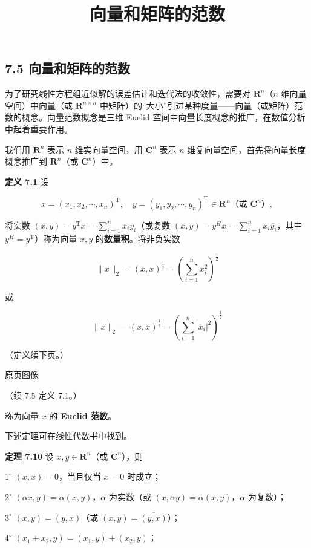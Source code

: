 \documentclass[
  10pt,
  fontset=fandol]{ctexart}
\title{向量和矩阵的范数}
\author{}
\date{}
\begin{document}
\maketitle

\subsection{7.5 向量和矩阵的范数}\label{ux5411ux91cfux548cux77e9ux9635ux7684ux8303ux6570}

为了研究线性方程组近似解的误差估计和迭代法的收敛性，需要对 \(\mathbf R^n\)（\(n\) 维向量空间）中向量（或 \(\mathbf R^{n\times n}\) 中矩阵）的``大小''引进某种度量------向量（或矩阵）范数的概念。向量范数概念是三维 Euclid 空间中向量长度概念的推广，在数值分析中起着重要作用。

我们用 \(\mathbf R^n\) 表示 \(n\) 维实向量空间，用 \(\mathbf C^n\) 表示 \(n\) 维复向量空间，首先将向量长度概念推广到 \(\mathbf R^n\)（或 \(\mathbf C^n\)）中。

\textbf{定义 7.1} 设

\[
x=(x_1,x_2,\cdots,x_n)^{\mathrm T},\quad y=(y_1,y_2,\cdots,y_n)^{\mathrm T}\in\mathbf R^n\text{（或 }\mathbf C^n\text{）},
\]

将实数 \((x,y)=y^{\mathrm T}x=\sum_{i=1}^{n}x_iy_i\)（或复数 \((x,y)=y^Hx=\sum_{i=1}^{n}x_i\overline{y_i}\)，其中 \(y^H=\overline{y^{\mathrm T}}\)）称为向量 \(x,y\) 的\textbf{数量积}。将非负实数

\[
\|x\|_2=(x,x)^{\frac12}=\left(\sum_{i=1}^{n}x_i^2\right)^{\frac12}
\]

或

\[
\|x\|_2=(x,x)^{\frac12}=\left(\sum_{i=1}^{n}|x_i|^2\right)^{\frac12}
\]

（定义续下页。）

\href{../../source-images/pdf-200.jpeg}{原页图像}

（续 7.5 定义 7.1。）

称为向量 \(x\) 的 \textbf{Euclid 范数}。

下述定理可在线性代数书中找到。

\textbf{定理 7.10} 设 \(x,y\in\mathbf R^n\)（或 \(\mathbf C^n\)），则

\(1^\circ\) \((x,x)=0\)，当且仅当 \(x=0\) 时成立；

\(2^\circ\) \((\alpha x,y)=\alpha(x,y)\)，\(\alpha\) 为实数（或 \((x,\alpha y)=\overline\alpha(x,y)\)，\(\alpha\) 为复数）；

\(3^\circ\) \((x,y)=(y,x)\)（或 \((x,y)=\overline{(y,x)}\)）；

\(4^\circ\) \((x_1+x_2,y)=(x_1,y)+(x_2,y)\)；
\end{document}
